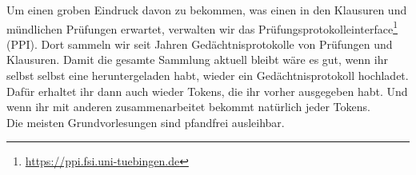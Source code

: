 Um einen groben Eindruck davon zu bekommen, was einen in den Klausuren und mündlichen Prüfungen erwartet, 
verwalten wir das Pr\"ufungsprotokolleinterface\footnote{\url{https://ppi.fsi.uni-tuebingen.de}} (PPI). 
Dort sammeln wir seit Jahren Ged\"achtnisprotokolle von Prüfungen und Klausuren. 
Damit die gesamte Sammlung aktuell bleibt wäre es gut, wenn ihr selbst selbst eine heruntergeladen habt, wieder ein Gedächtnisprotokoll hochladet. Dafür erhaltet ihr dann auch wieder Tokens, die ihr vorher ausgegeben habt. Und wenn ihr mit anderen zusammenarbeitet bekommt natürlich jeder Tokens. \\
Die meisten Grundvorlesungen sind pfandfrei ausleihbar.	%
